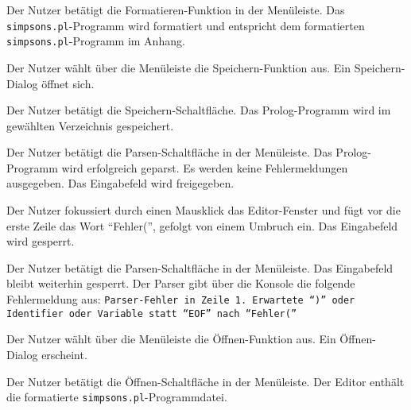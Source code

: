 \documentclass[parskip=full,11pt,twoside]{scrartcl}
\begin{document}
{Der Nutzer betätigt die Formatieren-Funktion in der Menüleiste.}
{Das \texttt{simpsons.pl}-Programm wird formatiert und entspricht dem formatierten \texttt{simpsons.pl}-Programm im Anhang.}

{Der Nutzer wählt über die Menüleiste die Speichern-Funktion aus.}
{Ein Speichern-Dialog öffnet sich.}

{Der Nutzer betätigt die Speichern-Schaltfläche.}
{Das Prolog-Programm wird im gewählten Verzeichnis gespeichert.}

{Der Nutzer betätigt die Parsen-Schaltfläche in der Menüleiste.}
{Das Prolog-Programm wird erfolgreich geparst. Es werden keine Fehlermeldungen ausgegeben. Das Eingabefeld wird freigegeben.}

{Der Nutzer fokussiert durch einen Mausklick das Editor-Fenster und fügt vor die erste Zeile das Wort \enquote{Fehler(}, gefolgt von einem Umbruch ein.}
{Das Eingabefeld wird gesperrt.}

{Der Nutzer betätigt die Parsen-Schaltfläche in der Menüleiste.}
{Das Eingabefeld bleibt weiterhin gesperrt. Der Parser gibt über die Konsole die folgende Fehlermeldung aus: \texttt{Parser-Fehler in Zeile 1. Erwartete \enquote{)} oder Identifier oder Variable statt \enquote{EOF} nach \enquote{Fehler(}}}


{Der Nutzer wählt über die Menüleiste die Öffnen-Funktion aus.}
{Ein Öffnen-Dialog erscheint.}

{Der Nutzer betätigt die Öffnen-Schaltfläche in der Menüleiste.}
{Der Editor enthält die formatierte \texttt{simpsons.pl}-Programmdatei.}
\end{document}
